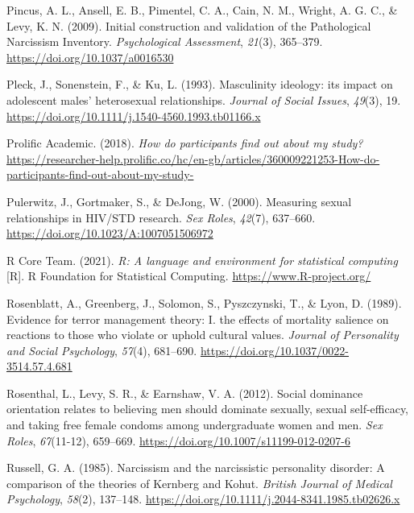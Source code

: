 \documentclass[
  donotrepeattitle,doc, 12pt, a4paper,floatsintext]{apa7}
\newlength{\cslhangindent}
\newlength{\cslentryspacingunit} %
\newenvironment{CSLReferences}[2] %
 {%
  \setlength{\parindent}{0pt}
  \ifodd #1
  \let\oldpar\par
  \def\par{\hangindent=\cslhangindent\oldpar}
  \fi
  \setlength{\parskip}{#2\cslentryspacingunit}
 }%
 {}
\begin{document}
\begin{CSLReferences}{1}{0}
\leavevmode{}%
Pincus, A. L., Ansell, E. B., Pimentel, C. A., Cain, N. M., Wright, A. G. C., \& Levy, K. N. (2009). Initial construction and validation of the Pathological Narcissism Inventory. \emph{Psychological Assessment}, \emph{21}(3), 365--379. \url{https://doi.org/10.1037/a0016530}

\leavevmode{}%
Pleck, J., Sonenstein, F., \& Ku, L. (1993). Masculinity ideology: its impact on adolescent males' heterosexual relationships. \emph{Journal of Social Issues}, \emph{49}(3), 19. \url{https://doi.org/10.1111/j.1540-4560.1993.tb01166.x}

\leavevmode{}%
Prolific Academic. (2018). \emph{How do participants find out about my study?} \url{https://researcher-help.prolific.co/hc/en-gb/articles/360009221253-How-do-participants-find-out-about-my-study-}

\leavevmode{}%
Pulerwitz, J., Gortmaker, S., \& DeJong, W. (2000). Measuring sexual relationships in HIV/STD research. \emph{Sex Roles}, \emph{42}(7), 637--660. \url{https://doi.org/10.1023/A:1007051506972}

\leavevmode{}%
R Core Team. (2021). \emph{R: A language and environment for statistical computing} {[}R{]}. R Foundation for Statistical Computing. \url{https://www.R-project.org/}

\leavevmode{}%
Rosenblatt, A., Greenberg, J., Solomon, S., Pyszczynski, T., \& Lyon, D. (1989). Evidence for terror management theory: I. the effects of mortality salience on reactions to those who violate or uphold cultural values. \emph{Journal of Personality and Social Psychology}, \emph{57}(4), 681--690. \url{https://doi.org/10.1037/0022-3514.57.4.681}

\leavevmode{}%
Rosenthal, L., Levy, S. R., \& Earnshaw, V. A. (2012). Social dominance orientation relates to believing men should dominate sexually, sexual self-efficacy, and taking free female condoms among undergraduate women and men. \emph{Sex Roles}, \emph{67}(11-12), 659--669. \url{https://doi.org/10.1007/s11199-012-0207-6}

\leavevmode{}%
Russell, G. A. (1985). Narcissism and the narcissistic personality disorder: A comparison of the theories of Kernberg and Kohut. \emph{British Journal of Medical Psychology}, \emph{58}(2), 137--148. \url{https://doi.org/10.1111/j.2044-8341.1985.tb02626.x}


\end{CSLReferences}
\end{document}
